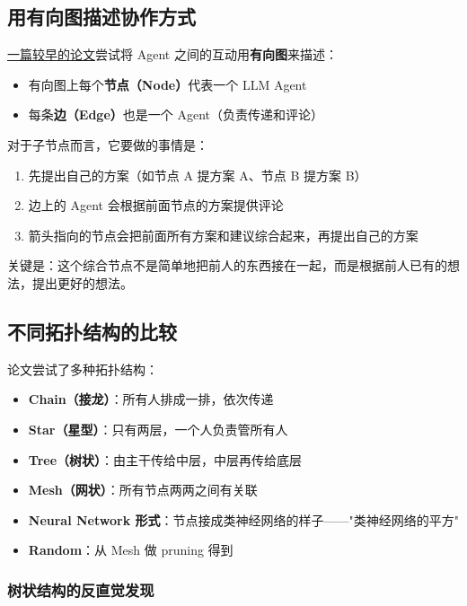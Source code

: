 \documentclass[12pt,a4paper]{article}
\begin{document}
\subsection{用有向图描述协作方式}

\href{https://arxiv.org/abs/2406.07155}{一篇较早的论文}尝试将 Agent 之间的互动用\textbf{有向图}来描述：

\begin{itemize}[leftmargin=2em]
  \item 有向图上每个\textbf{节点（Node）}代表一个 LLM Agent
  \item 每条\textbf{边（Edge）}也是一个 Agent（负责传递和评论）
\end{itemize}

对于子节点而言，它要做的事情是：

\begin{enumerate}[leftmargin=2em]
  \item 先提出自己的方案（如节点 A 提方案 A、节点 B 提方案 B）
  \item 边上的 Agent 会根据前面节点的方案提供评论
  \item 箭头指向的节点会把前面所有方案和建议综合起来，再提出自己的方案
\end{enumerate}

关键是：这个综合节点不是简单地把前人的东西接在一起，而是根据前人已有的想法，提出更好的想法。

\subsection{不同拓扑结构的比较}

论文尝试了多种拓扑结构：

\begin{itemize}[leftmargin=2em]
  \item \textbf{Chain（接龙）}：所有人排成一排，依次传递
  \item \textbf{Star（星型）}：只有两层，一个人负责管所有人
  \item \textbf{Tree（树状）}：由主干传给中层，中层再传给底层
  \item \textbf{Mesh（网状）}：所有节点两两之间有关联
  \item \textbf{Neural Network 形式}：节点接成类神经网络的样子——"类神经网络的平方"
  \item \textbf{Random}：从 Mesh 做 pruning 得到
\end{itemize}

\subsubsection{树状结构的反直觉发现}
\end{document}
